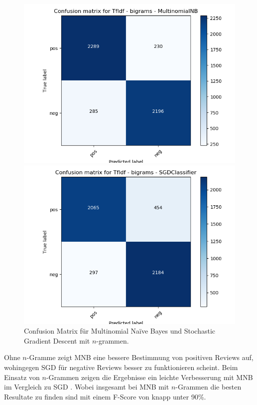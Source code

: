\documentclass[12pt]{scrartcl}
\begin{document}
    \begin{figure}[h]
        \begin{minipage}{0.45\textwidth}
            \includegraphics[scale=.35]{pictures/tfidf_b_mnb.png}
        \end{minipage}
        \hfill
        \begin{minipage}{0.45\textwidth}
            \includegraphics[scale=.35]{pictures/tfidf_b_sgd.png}
        \end{minipage}
        \caption{Confusion Matrix für Multinomial Naïve Bayes und Stochastic Gradient Descent mit $n$-grammen.}
    \end{figure}

    Ohne $n$-Gramme zeigt MNB eine bessere Bestimmung von positiven Reviews auf, wohingegen SGD für negative Reviews besser zu funktionieren scheint.
    Beim Einsatz von $n$-Grammen zeigen die Ergebnisse ein leichte Verbesserung mit MNB im Vergleich zu SGD .
    Wobei insgesamt bei MNB mit $n$-Grammen die besten Resultate zu finden sind mit einem F-Score von knapp unter 90\%.
\end{document}
